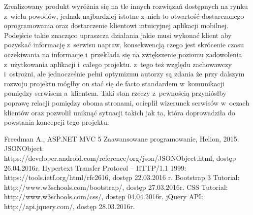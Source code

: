 \documentclass[a4paper,11pt]{article}
\begin{document}
Zrealizowany produkt wyróżnia się na tle innych rozwiązań dostępnych na rynku z~wielu powodów, jednak najbardziej istotne z~nich to otwartość dostarczonego oprogramowania oraz dostarczenie klientowi intuicyjnej aplikacji mobilnej. Podejście takie znacząco upraszcza działania jakie musi wykonać klient aby pozyskać informację z~serwisu napraw, konsekwencją czego jest skrócenie czasu oczekiwania na informacje i~przekłada się na zwiększenie poziomu zadowolenia z~użytkowania aplikacji i~całego projektu. z~tego też względu zachowawczy i~ostrożni, ale jednocześnie pełni optymizmu autorzy są zdania że przy dalszym rozwoju projektu mógłby on stać się de facto standardem w~komunikacji pomiędzy serwisem a~klientem. Taki stan rzeczy z~pewnością przyniósłby poprawę relacji pomiędzy oboma stronami, ocieplił wizerunek serwisów w~oczach klientów oraz pozwolił uniknąć sytuacji takich jak ta, która doprowadziła do powstania koncepcji tego projektu.

\newpage
\listoffigures
{} 
\newpage
\listoftables
{}



\newpage
{}
\begin{thebibliography}{9}
 Freedman A., ASP.NET MVC 5 Zaawansowane programowanie, Helion, 2015. 
 JSONObject: https://developer.android.com/reference/org/json/JSONObject.html, dostęp 26.04.2016r.
 Hypertext Transfer Protocol – HTTP/1.1 1999: https://tools.ietf.org/html/rfc2616, dostęp 22.03.2016 r.
 Bootstrap 3 Tutorial: http://www.w3schools.com/bootstrap/, dostęp 27.03.2016r.
 CSS Tutorial: http://www.w3schools.com/css/, dostęp 04.04.2016r.
 jQuery API: http://api.jquery.com/, dostęp 28.03.2016r.
\end{thebibliography}
\end{document}
